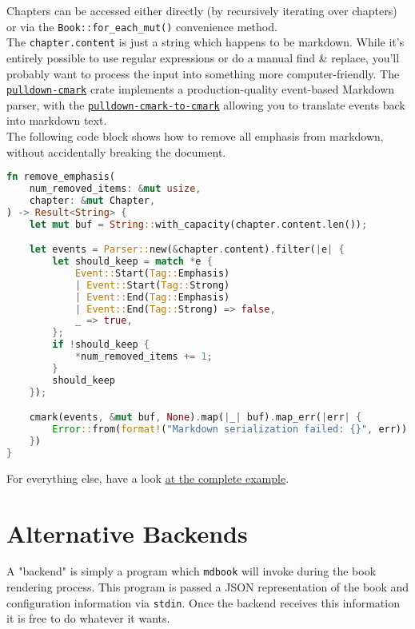 \documentclass{article}
\begin{document}
Chapters can be accessed either directly (by recursively iterating over
chapters) or via the \lstinline|Book::for_each_mut()| convenience method.\\

The \lstinline|chapter.content| is just a string which happens to be markdown. While it's
entirely possible to use regular expressions or do a manual find \& replace,
you'll probably want to process the input into something more computer-friendly.
The \href{https://crates.io/crates/pulldown-cmark}{\lstinline|pulldown-cmark|} crate implements a production-quality event-based
Markdown parser, with the \href{https://crates.io/crates/pulldown-cmark-to-cmark}{\lstinline|pulldown-cmark-to-cmark|} allowing you to
translate events back into markdown text.\\

The following code block shows how to remove all emphasis from markdown,
without accidentally breaking the document.\\
\begin{lstlisting}[language=rust]
fn remove_emphasis(
    num_removed_items: &mut usize,
    chapter: &mut Chapter,
) -> Result<String> {
    let mut buf = String::with_capacity(chapter.content.len());

    let events = Parser::new(&chapter.content).filter(|e| {
        let should_keep = match *e {
            Event::Start(Tag::Emphasis)
            | Event::Start(Tag::Strong)
            | Event::End(Tag::Emphasis)
            | Event::End(Tag::Strong) => false,
            _ => true,
        };
        if !should_keep {
            *num_removed_items += 1;
        }
        should_keep
    });

    cmark(events, &mut buf, None).map(|_| buf).map_err(|err| {
        Error::from(format!("Markdown serialization failed: {}", err))
    })
}

\end{lstlisting}

For everything else, have a look \href{https://github.com/rust-lang-nursery/mdBook/blob/master/examples/nop-preprocessor.rs}{at the complete example}.\\

\section{Alternative Backends}
\label{Alternative Backends}
\label{alternative-backends}

A "backend" is simply a program which \lstinline|mdbook| will invoke during the book
rendering process. This program is passed a JSON representation of the book and
configuration information via \lstinline|stdin|. Once the backend receives this
information it is free to do whatever it wants.\\
\end{document}

